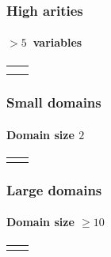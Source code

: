 \documentclass{beamer}
\begin{document}
\begin{frame}
  \frametitle{High arities}
  \framesubtitle{$>5$~variables}
  \begin{tabular}{cc}
    \begin{tikzpicture}[scale=0.5]
      
    \end{tikzpicture}
    &
      \begin{tikzpicture}[scale=0.5]
        
      \end{tikzpicture} \\
    \begin{tikzpicture}[scale=0.5]
      
    \end{tikzpicture}
    &
      \begin{tikzpicture}[scale=0.5]
        
      \end{tikzpicture} \\
  \end{tabular}
\end{frame}


\begin{frame}
  \frametitle{Small domains}
  \framesubtitle{Domain size $2$}
  \begin{tabular}{cc}
    \begin{tikzpicture}[scale=0.5]
      
    \end{tikzpicture}
    &
      \begin{tikzpicture}[scale=0.5]
        
      \end{tikzpicture} \\
    \end{tabular}
\end{frame}

\begin{frame}
  \frametitle{Large domains}
  \framesubtitle{Domain size $\geq 10$}
  \begin{tabular}{cc}
    \begin{tikzpicture}[scale=0.5]
      
    \end{tikzpicture}
    &
      \begin{tikzpicture}[scale=0.5]
        
      \end{tikzpicture} \\
  \end{tabular}
\end{frame}
\end{document}
